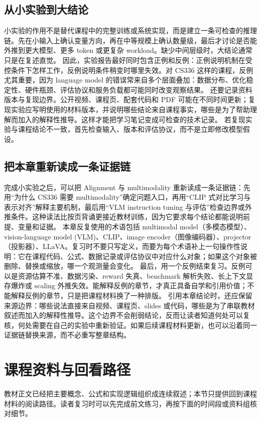 \documentclass[a4paper]{article}
\begin{document}
\subsection{从小实验到大结论}
小实验的作用不是替代课程中的完整训练或系统实现，而是建立一条可检查的推理链。先在小输入上确认变量方向，再在中等规模上确认数量级，最后才讨论是否能外推到更大模型、更多 token 或更复杂 workload。缺少中间层级时，大结论通常只是在复述直觉。
因此，实验报告最好同时包含正例和反例：正例说明机制在受控条件下怎样工作，反例说明条件稍变时哪里失效。对 CS336 这样的课程，反例尤其重要，因为 language model 的错误常来自多个层面叠加：数据分布、优化稳定性、硬件瓶颈、评估协议和服务负载都可能同时改变观察结果。
还要记录资料版本与复现边界。公开视频、课程页、配套代码和 PDF 可能在不同时间更新；复现实验应写明使用的材料版本，并说明哪些结论来自课程事实，哪些是为了帮助理解而加入的解释性推导。这样才能把学习笔记变成可检查的技术记录。
若复现实验与课程结论不一致，首先检查输入、版本和评估协议，而不是立即修改模型假设。
\subsection{把本章重新读成一条证据链}
完成小实验之后，可以把 Alignment 与 multimodality 重新读成一条证据链：先用“为什么 CS336 需要 multimodality”确定问题入口，再用“CLIP 式对比学习与表示对齐”解释主要机制，最后用“VLM instruction tuning 与评估”检查边界或外推条件。这种读法比按页背诵更接近教材训练，因为它要求每个结论都能说明前提、变量和证据。
本章反复使用的术语包括 multimodal model（多模态模型）、vision-language model (VLM)、CLIP、image encoder（图像编码器）、projector（投影器）、LLaVA。复习时不要只写定义，而要为每个术语补上一句操作性说明：它在课程代码、公式、数据记录或评估协议中对应什么对象；如果这个对象被删除、替换或缩放，哪一个观测量会变化。
最后，用一个反例结束复习。反例可以是资源估算不准、数据污染、reward 失真、benchmark 解析失败、长上下文显存爆炸或 scaling 外推失效。能解释反例的章节，才真正具备自学和引用价值；不能解释反例的章节，只是把课程材料换了一种排版。
引用本章结论时，还应保留来源边界：哪些说法直接来自视频、课程页、slides 或代码，哪些是为了串联教材叙述而加入的解释性推导。这个边界不会削弱结论，反而让读者知道何处可以复核，何处需要在自己的实验中重新验证。如果后续课程材料更新，也可以沿着同一证据链替换来源，而不必重写整章结构。
\section{课程资料与回看路径}
教材正文已经把主要概念、公式和实现逻辑组织成连续叙述；本节只提供回到课程材料的阅读路径。读者复习时可以先完成前文练习，再按下面的时间段或资料组核对细节。
\end{document}
